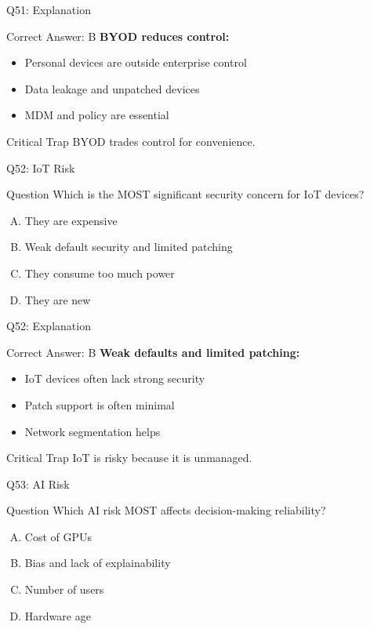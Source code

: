 \documentclass{beamer}
\begin{document}
	\begin{frame}{Q51: Explanation}
		\begin{block}{Correct Answer: B}
			\textbf{BYOD reduces control:}
			\begin{itemize}
				\item Personal devices are outside enterprise control
				\item Data leakage and unpatched devices
				\item MDM and policy are essential
			\end{itemize}
		\end{block}
		\begin{alertblock}{Critical Trap}
			BYOD trades control for convenience.
		\end{alertblock}
	\end{frame}
	
	\begin{frame}{Q52: IoT Risk}
		\begin{block}{Question}
			Which is the MOST significant security concern for IoT devices?
		\end{block}
		\begin{enumerate}[(A)]
			\item They are expensive
			\item Weak default security and limited patching
			\item They consume too much power
			\item They are new
		\end{enumerate}
	\end{frame}
	
	\begin{frame}{Q52: Explanation}
		\begin{block}{Correct Answer: B}
			\textbf{Weak defaults and limited patching:}
			\begin{itemize}
				\item IoT devices often lack strong security
				\item Patch support is often minimal
				\item Network segmentation helps
			\end{itemize}
		\end{block}
		\begin{alertblock}{Critical Trap}
			IoT is risky because it is unmanaged.
		\end{alertblock}
	\end{frame}
	
	\begin{frame}{Q53: AI Risk}
		\begin{block}{Question}
			Which AI risk MOST affects decision-making reliability?
		\end{block}
		\begin{enumerate}[(A)]
			\item Cost of GPUs
			\item Bias and lack of explainability
			\item Number of users
			\item Hardware age
		\end{enumerate}
	\end{frame}
	
\end{document}
